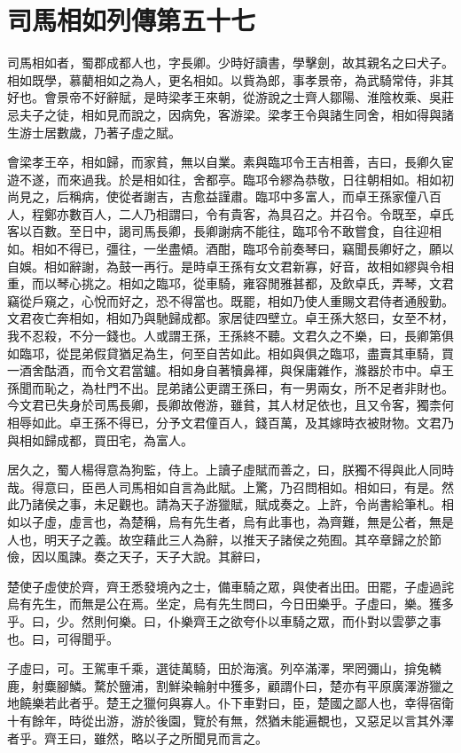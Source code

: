 \chapter{司馬相如列傳第五十七}

司馬相如者，蜀郡成都人也，字長卿。少時好讀書，學擊劍，故其親名之曰犬子。相如既學，慕藺相如之為人，更名相如。以貲為郎，事孝景帝，為武騎常侍，非其好也。會景帝不好辭賦，是時梁孝王來朝，從游說之士齊人鄒陽、淮陰枚乘、吳莊忌夫子之徒，相如見而說之，因病免，客游梁。梁孝王令與諸生同舍，相如得與諸生游士居數歲，乃著子虛之賦。

會梁孝王卒，相如歸，而家貧，無以自業。素與臨邛令王吉相善，吉曰，長卿久宦遊不遂，而來過我。於是相如往，舍都亭。臨邛令繆為恭敬，日往朝相如。相如初尚見之，后稱病，使從者謝吉，吉愈益謹肅。臨邛中多富人，而卓王孫家僮八百人，程鄭亦數百人，二人乃相謂曰，令有貴客，為具召之。并召令。令既至，卓氏客以百數。至日中，謁司馬長卿，長卿謝病不能往，臨邛令不敢嘗食，自往迎相如。相如不得已，彊往，一坐盡傾。酒酣，臨邛令前奏琴曰，竊聞長卿好之，願以自娛。相如辭謝，為鼓一再行。是時卓王孫有女文君新寡，好音，故相如繆與令相重，而以琴心挑之。相如之臨邛，從車騎，雍容閒雅甚都，及飲卓氏，弄琴，文君竊從戶窺之，心悅而好之，恐不得當也。既罷，相如乃使人重賜文君侍者通殷勤。文君夜亡奔相如，相如乃與馳歸成都。家居徒四壁立。卓王孫大怒曰，女至不材，我不忍殺，不分一錢也。人或謂王孫，王孫終不聽。文君久之不樂，曰，長卿第俱如臨邛，從昆弟假貸猶足為生，何至自苦如此。相如與俱之臨邛，盡賣其車騎，買一酒舍酤酒，而令文君當鑪。相如身自著犢鼻褌，與保庸雜作，滌器於市中。卓王孫聞而恥之，為杜門不出。昆弟諸公更謂王孫曰，有一男兩女，所不足者非財也。今文君已失身於司馬長卿，長卿故倦游，雖貧，其人材足依也，且又令客，獨柰何相辱如此。卓王孫不得已，分予文君僮百人，錢百萬，及其嫁時衣被財物。文君乃與相如歸成都，買田宅，為富人。

居久之，蜀人楊得意為狗監，侍上。上讀子虛賦而善之，曰，朕獨不得與此人同時哉。得意曰，臣邑人司馬相如自言為此賦。上驚，乃召問相如。相如曰，有是。然此乃諸侯之事，未足觀也。請為天子游獵賦，賦成奏之。上許，令尚書給筆札。相如以子虛，虛言也，為楚稱，烏有先生者，烏有此事也，為齊難，無是公者，無是人也，明天子之義。故空藉此三人為辭，以推天子諸侯之苑囿。其卒章歸之於節儉，因以風諫。奏之天子，天子大說。其辭曰，

楚使子虛使於齊，齊王悉發境內之士，備車騎之眾，與使者出田。田罷，子虛過詫烏有先生，而無是公在焉。坐定，烏有先生問曰，今日田樂乎。子虛曰，樂。獲多乎。曰，少。然則何樂。曰，仆樂齊王之欲夸仆以車騎之眾，而仆對以雲夢之事也。曰，可得聞乎。

子虛曰，可。王駕車千乘，選徒萬騎，田於海濱。列卒滿澤，罘罔彌山，揜兔轔鹿，射麋腳鱗。騖於鹽浦，割鮮染輪射中獲多，顧謂仆曰，楚亦有平原廣澤游獵之地饒樂若此者乎。楚王之獵何與寡人。仆下車對曰，臣，楚國之鄙人也，幸得宿衛十有餘年，時從出游，游於後園，覽於有無，然猶未能遍覩也，又惡足以言其外澤者乎。齊王曰，雖然，略以子之所聞見而言之。

